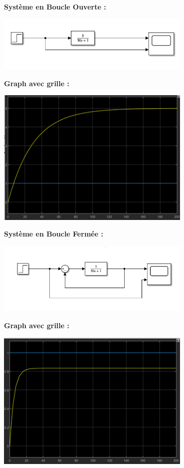\documentclass{article}
\begin{document}
\textsf{\textbf{Système en Boucle Ouverte :}}
\begin{center}
\includegraphics[width=0.7\textwidth]{EXERCICE 6 1.png}
\end{center}\textsf{\textbf{Graph avec grille :}}
\begin{center}
\includegraphics[width=0.7\textwidth]{EXERCICE 6 2.png}
\newpage
\end{center}\textsf{\textbf{Système en Boucle Fermée :}}
\begin{center}
\includegraphics[width=0.7\textwidth]{EXERCICE 6 3.png}
\end{center}\textsf{\textbf{Graph avec grille :}}
\begin{center}
\includegraphics[width=0.7\textwidth]{EXERCICE 6 4.png}
\end{center}
\newpage
\end{document}
